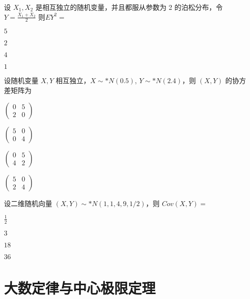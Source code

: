 \documentclass{exam-zh}
\begin{document}
\begin{question}
  设 $X_1, X_2$ 是相互独立的随机变量，并且都服从参数为 2 的泊松分布，令
  $Y = \frac{X_1 + X_2}{2}$
  则$EY^2 =$
  \paren[A]
  \begin{choices}
    \item $5$
    \item $2$
    \item $4$
    \item $1$
  \end{choices}
\end{question}

\begin{question}
  设随机变量 $X, Y$ 相互独立，$X \sim* N(0.5)$, $Y \sim* N(2.4)$，则
  $(X, Y)$
  的协方差矩阵为 \paren[B]
  \begin{choices}
    \item $\begin{pmatrix} 0 & 5 \\ 2 & 0 \end{pmatrix}$
    \item $\begin{pmatrix} 5 & 0 \\ 0 & 4 \end{pmatrix}$
    \item $\begin{pmatrix} 0 & 5 \\ 4 & 2 \end{pmatrix}$
    \item $\begin{pmatrix} 5 & 0 \\ 2 & 4 \end{pmatrix}$
  \end{choices}
\end{question}

\begin{question}
  设二维随机向量 $(X, Y) \sim* N(1, 1, 4, 9, 1/2)$，则
  $Cov(X, Y) =$
  \paren[B]
  \begin{choices}
    \item $\frac{1}{2}$
    \item $3$
    \item $18$
    \item $36$
  \end{choices}
\end{question}

\section{大数定律与中心极限定理}
\end{document}
